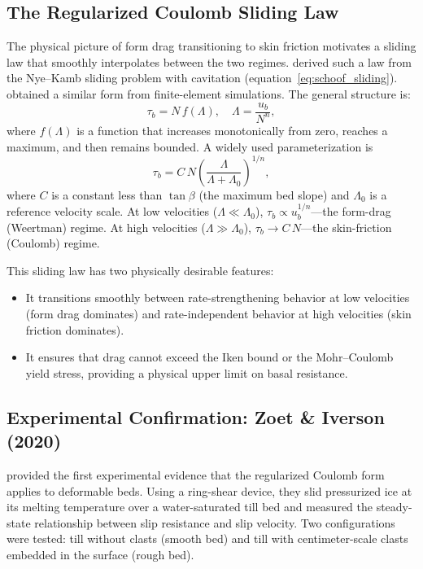 \documentclass[11pt]{article}
\begin{document}
\subsection{The Regularized Coulomb Sliding Law}
\label{sec:coulomb_sliding}

The physical picture of form drag transitioning to skin friction motivates a sliding law that smoothly interpolates between the two regimes.  \cite{Schoof2005} derived such a law from the Nye--Kamb sliding problem with cavitation (equation~\ref{eq:schoof_sliding}).  \cite{Gagliardinietal2007} obtained a similar form from finite-element simulations.  The general structure is:
\begin{equation}
  \boxed{\tau_b = N\,f(\Lambda), \quad \Lambda = \frac{u_b}{N^n},}
  \label{eq:regularized_coulomb}
\end{equation}
where $f(\Lambda)$ is a function that increases monotonically from zero, reaches a maximum, and then remains bounded.  A widely used parameterization \cite{Schoof2005,Gagliardinietal2007} is
\begin{equation}
  \tau_b = C\,N\left(\frac{\Lambda}{\Lambda + \Lambda_0}\right)^{1/n},
  \label{eq:coulomb_sliding}
\end{equation}
where $C$ is a constant less than $\tan\beta$ (the maximum bed slope) and $\Lambda_0$ is a reference velocity scale.  At low velocities ($\Lambda \ll \Lambda_0$), $\tau_b \propto u_b^{1/n}$---the form-drag (Weertman) regime.  At high velocities ($\Lambda \gg \Lambda_0$), $\tau_b \to C\,N$---the skin-friction (Coulomb) regime.

\medskip
\noindent This sliding law has two physically desirable features:
\begin{itemize}
  \item It transitions smoothly between rate-strengthening behavior at low velocities (form drag dominates) and rate-independent behavior at high velocities (skin friction dominates).
  \item It ensures that drag cannot exceed the Iken bound or the Mohr--Coulomb yield stress, providing a physical upper limit on basal resistance.
\end{itemize}

\subsection{Experimental Confirmation: Zoet \& Iverson (2020)}
\label{sec:zoet_iverson}

\cite{ZoetIverson2020} provided the first experimental evidence that the regularized Coulomb form applies to deformable beds.  Using a ring-shear device, they slid pressurized ice at its melting temperature over a water-saturated till bed and measured the steady-state relationship between slip resistance and slip velocity.  Two configurations were tested: till without clasts (smooth bed) and till with centimeter-scale clasts embedded in the surface (rough bed).
\end{document}
